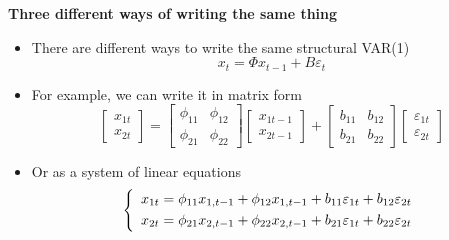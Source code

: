 \documentclass[10pt,english,t,aspectratio=169,ignorenonframetext]{beamer}
\begin{document}
\begin{frame}
{\textbf{Three different ways of writing the same thing}}\smallskip

\begin{itemize}
\item There are different ways to write the same structural VAR(1)%
\begin{equation*}
x_{t}=\Phi x_{t-1}+B\varepsilon _{t}
\end{equation*}%
\pause\vspace{-0.3cm}

\item For example, we can write it in matrix form%
\begin{equation*}
\begin{bmatrix}
x_{1t} \\ 
x_{2t}%
\end{bmatrix}%
=\left[ 
\begin{array}{cc}
\phi _{11} & \phi _{12} \\ 
\phi _{21} & \phi _{22}%
\end{array}%
\right] 
\begin{bmatrix}
x_{1t-1} \\ 
x_{2t-1}%
\end{bmatrix}%
+\left[ 
\begin{array}{cc}
b_{11} & b_{12} \\ 
b_{21} & b_{22}%
\end{array}%
\right] 
\begin{bmatrix}
\varepsilon _{1t} \\ 
\varepsilon _{2t}%
\end{bmatrix}%
\end{equation*}%
\pause

\item Or as a system of linear equations%
\begin{equation*}
\left\{ 
\begin{array}{l}
x_{1t}=\phi _{11}x_{1,t-1}+\phi _{12}x_{1,t-1}+b_{11}\varepsilon
_{1t}+b_{12}\varepsilon _{2t}\smallskip \\ 
x_{2t}=\phi _{21}x_{2,t-1}+\phi _{22}x_{2,t-1}+b_{21}\varepsilon
_{1t}+b_{22}\varepsilon _{2t}%
\end{array}%
\right.
\end{equation*}
\end{itemize}
\end{frame}

\end{document}
